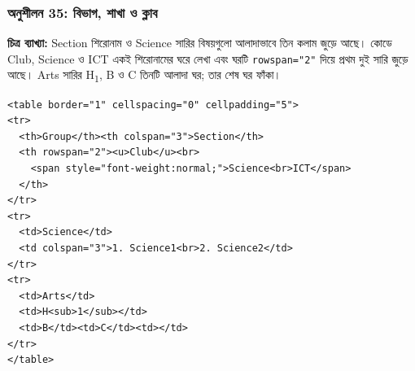 \par\noindent\subsubsection{অনুশীলন 35: বিভাগ, শাখা ও ক্লাব}%
\noindent
\textbf{চিত্র ব্যাখ্যা:} 
Section শিরোনাম ও Science সারির বিষয়গুলো আলাদাভাবে তিন কলাম জুড়ে আছে। কোডে Club, Science ও ICT একই শিরোনামের ঘরে লেখা এবং ঘরটি \texttt{rowspan="2"} দিয়ে প্রথম দুই সারি জুড়ে আছে। Arts সারির H\textsubscript{1}, B ও C তিনটি আলাদা ঘর; তার শেষ ঘর ফাঁকা।






\par\smallskip
\noindent\begin{minipage}[t]{\linewidth}\vspace{0pt}
\begingroup\centering
{}
\par\endgroup
\end{minipage}
\par\smallskip
{}
\par{}\par\smallskip
\begin{verbatim}
<table border="1" cellspacing="0" cellpadding="5">
<tr>
  <th>Group</th><th colspan="3">Section</th>
  <th rowspan="2"><u>Club</u><br>
    <span style="font-weight:normal;">Science<br>ICT</span>
  </th>
</tr>
<tr>
  <td>Science</td>
  <td colspan="3">1. Science1<br>2. Science2</td>
</tr>
<tr>
  <td>Arts</td>
  <td>H<sub>1</sub></td>
  <td>B</td><td>C</td><td></td>
</tr>
</table>
\end{verbatim}
\smallskip


